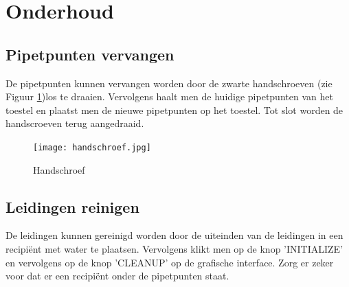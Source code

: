 \documentclass[a4paper,twoside,kulak]{kulakreport} %
\begin{document}
\chapter*{Onderhoud} 

\section*{Pipetpunten vervangen}

De pipetpunten kunnen vervangen worden door de zwarte handschroeven (zie Figuur \ref{fig: handschroef})los te draaien. Vervolgens haalt men de huidige pipetpunten van het toestel en plaatst men de nieuwe pipetpunten op het toestel. Tot slot worden de handscroeven terug aangedraaid. 

\begin{figure}[h]
	\centering
	\texttt{[image: handschroef.jpg]}
	\caption{Handschroef}
	\label{fig: handschroef}
\end{figure}

\section*{Leidingen reinigen}

De leidingen kunnen gereinigd worden door de uiteinden van de leidingen in een recipiënt met water te plaatsen. Vervolgens klikt men op de knop 'INITIALIZE' en vervolgens op de knop 'CLEANUP' op de grafische interface. Zorg er zeker voor dat er een recipiënt onder de pipetpunten staat.
\end{document}
